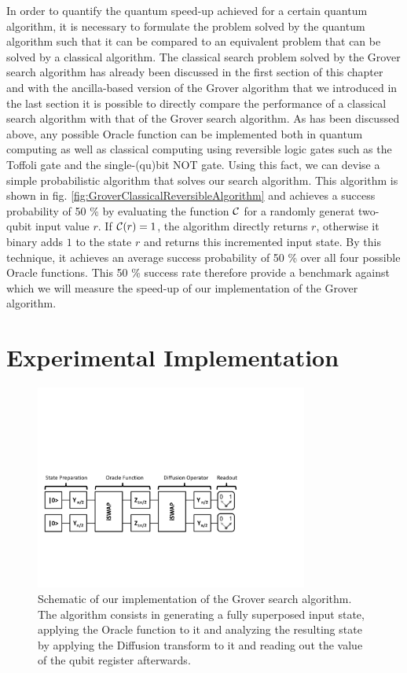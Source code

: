 In order to quantify the quantum speed-up achieved for a certain quantum algorithm, it is necessary to formulate the problem solved by the quantum algorithm such that it can be compared to an equivalent problem that can be solved by a classical algorithm. The classical search problem solved by the Grover search algorithm has already been discussed in the first section of this chapter and with the ancilla-based version of the Grover algorithm that we introduced in the last section it is possible to directly compare the performance of a classical search algorithm with that of the Grover search algorithm. As has been discussed above, any possible Oracle function can be implemented both in quantum computing as well as classical computing using reversible logic gates such as the Toffoli gate and the single-(qu)bit NOT gate. Using this fact, we can devise a simple probabilistic algorithm that solves our search algorithm. This algorithm is shown in fig. \ref{fig:GroverClassicalReversibleAlgorithm} and achieves a success probability of 50 \% by evaluating the function $\Or$ for a randomly generat two-qubit input value $r$. If $\Or(r)=1$, the algorithm directly returns $r$, otherwise it binary adds $1$ to the state $r$ and returns this incremented input state. By this technique, it achieves an average success probability of 50 \% over all four possible Oracle functions. This 50 \% success rate therefore provide a benchmark against which we will measure the speed-up of our implementation of the Grover algorithm.


\section{Experimental Implementation}

\begin{figure}[ht!]
	\centering
		\includegraphics[width=0.8\textwidth]{./material/papers/grover/grover_algorithm}
	\caption[Schematic of our implementation of the Grover search algorithm]{Schematic of our implementation of the Grover search algorithm. The algorithm consists in generating a fully superposed input state, applying the Oracle function to it and analyzing the resulting state by applying the Diffusion transform to it and reading out the value of the qubit register afterwards.}
	\label{fig:GroverAlgorithmSchematic}
\end{figure}

